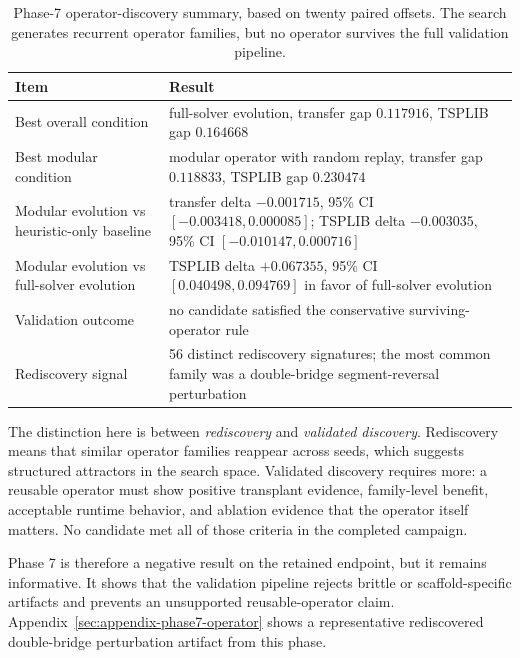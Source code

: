\begin{table}[t]
\centering
\scriptsize
\setlength{\tabcolsep}{3pt}
\begin{tabularx}{\textwidth}{
  >{\raggedright\arraybackslash}p{1.7in}
  Y
}
\toprule
Item & Result \\
\midrule
Best overall condition & full-solver evolution, transfer gap $0.117916$, TSPLIB gap $0.164668$ \\
Best modular condition & modular operator with random replay, transfer gap $0.118833$, TSPLIB gap $0.230474$ \\
Modular evolution vs heuristic-only baseline & transfer delta $-0.001715$, 95\% CI $[-0.003418,0.000085]$; TSPLIB delta $-0.003035$, 95\% CI $[-0.010147,0.000716]$ \\
Modular evolution vs full-solver evolution & TSPLIB delta $+0.067355$, 95\% CI $[0.040498,0.094769]$ in favor of full-solver evolution \\
Validation outcome & no candidate satisfied the conservative surviving-operator rule \\
Rediscovery signal & 56 distinct rediscovery signatures; the most common family was a double-bridge segment-reversal perturbation \\
\bottomrule
\end{tabularx}
\caption[Phase-7 operator-discovery summary]{Phase-7 operator-discovery summary, based on twenty paired offsets. The search
generates recurrent operator families, but no operator survives the full validation pipeline.}
\label{tab:phase7-summary}
\end{table}

The distinction here is between \emph{rediscovery} and \emph{validated discovery}. Rediscovery
means that similar operator families reappear across seeds, which suggests structured attractors in
the search space. Validated discovery requires more: a reusable operator must show positive
transplant evidence, family-level benefit, acceptable runtime behavior, and ablation evidence that
the operator itself matters. No candidate met all of those criteria in the completed campaign.

Phase 7 is therefore a negative result on the retained endpoint, but it remains informative. It
shows that the validation pipeline rejects brittle or scaffold-specific artifacts and prevents an
unsupported reusable-operator claim. Appendix~\ref{sec:appendix-phase7-operator} shows a
representative rediscovered double-bridge perturbation artifact from this phase.

